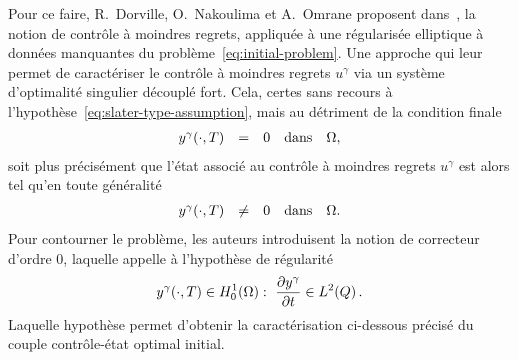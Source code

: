 Pour ce faire, R.~Dorville, O.~Nakoulima et A.~Omrane proposent
dans~\cite{dorville}, la notion de contrôle à moindres regrets, appliquée à
une régularisée elliptique à données manquantes du
problème~\eqref{eq:initial-problem}. Une approche qui leur permet de
caractériser le contrôle à moindres regrets $u^{\gamma}$ via un système
d'optimalité singulier découplé fort. Cela, certes sans recours à
l'hypothèse~\eqref{eq:slater-type-assumption}, mais au détriment de la
condition finale
\begin{equation*}
    \begin{array}{rclll}
        {y^{\gamma}}\!\left({\cdot,T}\right) & = & 0 & \text{dans} & \Omega,
    \end{array}
\end{equation*}
soit plus précisément que l'état associé au contrôle à moindres regrets
$u^{\gamma}$ est alors tel qu'en toute généralité
\begin{equation*}
    \begin{array}{rclll}
        {y^{\gamma}}\!\left({\cdot,T}\right) & \neq & 0 & \text{dans} & \Omega.
    \end{array}
\end{equation*}
Pour contourner le problème,
les auteurs introduisent la notion de correcteur d'ordre $0$, laquelle
appelle à l'hypothèse de régularité
\begin{equation}\label{eq:dorvilleassumption}
    {y^{\gamma}}\!\left({\cdot,T}\right)\in H_{0}^{1}(\Omega):\
    \dfrac{\partial{}y^{\gamma}}{\partial{}t}\in L^{2}\!\left({Q}\right).
\end{equation}
Laquelle hypothèse permet d'obtenir la caractérisation ci-dessous précisé
du couple contrôle-état optimal initial.

